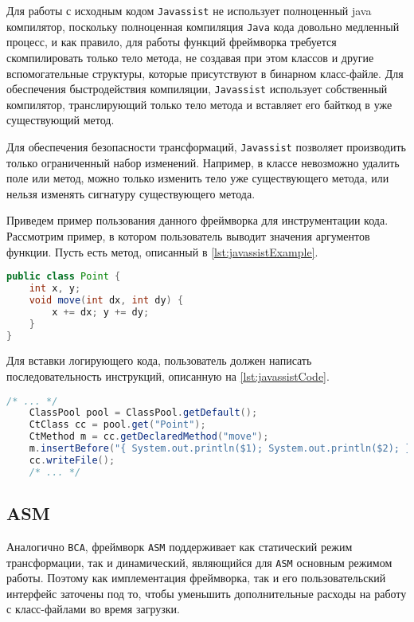 Для работы с исходным кодом \texttt{Javassist} не использует полноценный java компилятор, поскольку полноценная компиляция \texttt{Java} кода довольно медленный процесс, и как правило, для работы функций фреймворка требуется скомпилировать только тело метода, не создавая при этом классов и другие вспомогательные структуры, которые присутствуют в бинарном класс-файле. Для обеспечения быстродействия компиляции, \texttt{Javassist} использует собственный компилятор, транслирующий только тело метода и вставляет его байткод в уже существующий метод.

Для обеспечения безопасности трансформаций, \texttt{Javassist} позволяет производить только ограниченный набор изменений. Например, в классе невозможно удалить поле или метод, можно только изменить тело уже существующего метода, или нельзя изменять сигнатуру существующего метода.

Приведем пример пользования данного фреймворка для инструментации кода. Рассмотрим пример, в котором пользователь выводит значения аргументов функции. Пусть есть метод, описанный в \autoref{lst:javassistExample}.

\begin{lstlisting}[language=Java, caption=Исходный класс, label=lst:javassistExample]
public class Point {
    int x, y;
    void move(int dx, int dy) {
        x += dx; y += dy;
    }
}
\end{lstlisting}

Для вставки логирующего кода, пользователь должен написать последовательность инструкций, описанную на \autoref{lst:javassistCode}.

\begin{lstlisting}[language=Java, caption={Код, добавляющий логирование}, label=lst:javassistCode]
    /* ... */
    ClassPool pool = ClassPool.getDefault();
    CtClass cc = pool.get("Point");
    CtMethod m = cc.getDeclaredMethod("move");
    m.insertBefore("{ System.out.println($1); System.out.println($2); }");
    cc.writeFile();
    /* ... */
\end{lstlisting}

\subsection{ASM}

Аналогично \texttt{BCA}, фреймворк \texttt{ASM} \cite{asm} поддерживает как статический режим трансформации, так и динамический, являющийся для \texttt{ASM} основным режимом работы. Поэтому как имплементация фреймворка, так и его пользовательский интерфейс заточены под то, чтобы уменьшить дополнительные расходы на работу с класс-файлами во время загрузки.

